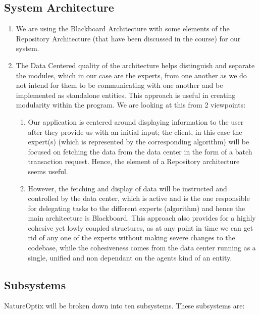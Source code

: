 \documentclass[]{article}
\begin{document}
\subsection{System Architecture}
\label{sub:system_architecture}
\begin{enumerate}[1)]
	\item We are using the Blackboard Architecture with some elements of the Repository Architecture (that have been discussed in the course) for our system.
	\item The Data Centered quality of the architecture helps distinguish and separate the modules, which in our case are the experts, from one another as we do not intend for them to be communicating with one another and be implemented as standalone entities. This approach is useful in creating modularity within the program. We are looking at this from 2 viewpoints:
	\begin{enumerate}
		\item Our application is centered around displaying information to the user after they provide us with an initial input; the client, in this case the expert(s) (which is represented by the corresponding algorithm) will be focused on fetching the data from the data center in the form of a batch transaction request. Hence, the element of a Repository architecture seems useful.
		\item However, the fetching and display of data will be instructed and controlled by the data center, which is active and is the one responsible for delegating tasks to the different experts (algorithm) and hence the main architecture is Blackboard. This approach also provides for a highly cohesive yet lowly coupled structures, as at any point in time we can get rid of any one of the experts without making severe changes to the codebase, while the cohesiveness comes from the data center running as a single, unified and non dependant on the agents kind of an entity.
	\end{enumerate}
\end{enumerate}

\subsection{Subsystems}
\label{sub:subsystems}
NatureOptix will be broken down into ten subsystems. These subsystems are:
\end{document}
